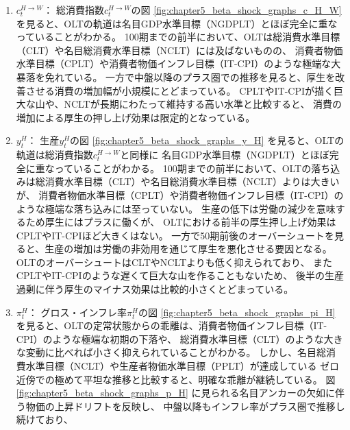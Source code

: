 \begin{enumerate}
    \item
    \label{itm:chapter5_beta_shock_policies_olt_c_H_W}
        \(c_t^{H\to W}\)：
        総消費指数\(c_t^{H\to W}\)の図
        \ref{fig:chapter5_beta_shock_graphs_c_H_W}
        を見ると、OLTの軌道は名目GDP水準目標（NGDPLT）とほぼ完全に重なっていることがわかる。
        100期までの前半において、OLTは総消費水準目標（CLT）や名目総消費水準目標（NCLT）には及ばないものの、
        消費者物価水準目標（CPLT）や消費者物価インフレ目標（IT-CPI）のような極端な大暴落を免れている。
        一方で中盤以降のプラス圏での推移を見ると、厚生を改善させる消費の増加幅が小規模にとどまっている。
        CPLTやIT-CPIが描く巨大な山や、NCLTが長期にわたって維持する高い水準と比較すると、
        消費の増加による厚生の押し上げ効果は限定的となっている。
    \item
    \label{itm:chapter5_beta_shock_policies_olt_y_H}
        \(y_t^H\)：
        生産\(y_t^H\)の図
        \ref{fig:chapter5_beta_shock_graphs_y_H}
        を見ると、OLTの軌道は総消費指数\(c_t^{H\to W}\)と同様に
        名目GDP水準目標（NGDPLT）とほぼ完全に重なっていることがわかる。
        100期までの前半において、OLTの落ち込みは総消費水準目標（CLT）や名目総消費水準目標（NCLT）よりは大きいが、
        消費者物価水準目標（CPLT）や消費者物価インフレ目標（IT-CPI）のような極端な落ち込みには至っていない。
        生産の低下は労働の減少を意味するため厚生にはプラスに働くが、
        OLTにおける前半の厚生押し上げ効果はCPLTやIT-CPIほど大きくはない。
        一方で50期前後のオーバーシュートを見ると、生産の増加は労働の非効用を通じて厚生を悪化させる要因となる。
        OLTのオーバーシュートはCLTやNCLTよりも低く抑えられており、
        またCPLTやIT-CPIのような遅くて巨大な山を作ることもないため、
        後半の生産過剰に伴う厚生のマイナス効果は比較的小さくとどまっている。
    \item
    \label{itm:chapter5_beta_shock_policies_olt_pi_H}
        \(\pi_t^H\)：
        グロス・インフレ率\(\pi_t^H\)の図
        \ref{fig:chapter5_beta_shock_graphs_pi_H}
        を見ると、OLTの定常状態からの乖離は、消費者物価インフレ目標（IT-CPI）のような極端な初期の下落や、
        総消費水準目標（CLT）のような大きな変動に比べれば小さく抑えられていることがわかる。
        しかし、名目総消費水準目標（NCLT）や生産者物価水準目標（PPLT）が達成している
        ゼロ近傍での極めて平坦な推移と比較すると、明確な乖離が継続している。
        図
        \ref{fig:chapter5_beta_shock_graphs_p_H}
        に見られる名目アンカーの欠如に伴う物価の上昇ドリフトを反映し、
        中盤以降もインフレ率がプラス圏で推移し続けており、

\end{enumerate}
